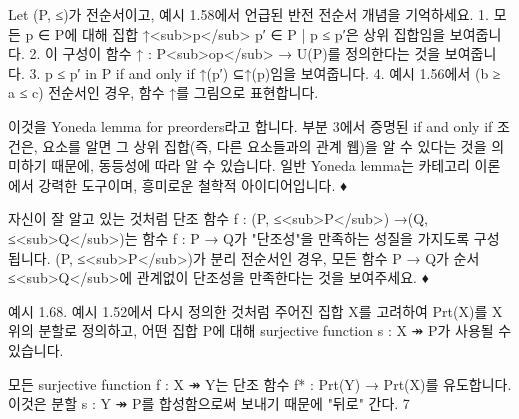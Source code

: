 \documentclass[11pt, a4paper, twoside, openany]{book}
\begin{document}
\par\medskip
\begin{exercisebox}[연습문제 1.66.]
Let (P, ≤)가 전순서이고, 예시 1.58\hspace{0pt}에서 언급된 반전 전순서 개념을 기억하세요.
1. 모든 p ∈ P\hspace{0pt}에 대해 집합 ↑<sub>p</sub> {p′ ∈ P | p ≤ p′}은 상위 집합임을 보여줍니다.
2. 이 구성이 함수 ↑ : P<sub>op</sub> → U(P)를 정의한다는 것을 보여줍니다.
3. p ≤ p′ in P if and only if ↑(p′) ⊆↑(p)임을 보여줍니다.
4. 예시 1.56\hspace{0pt}에서 (b ≥ a ≤ c) 전순서인 경우, 함수 ↑를 그림으로 표현합니다.
\end{exercisebox}

\par\medskip
이것을 Yoneda lemma for preorders\hspace{0pt}라고 합니다. 부분 3\hspace{0pt}에서 증명된 if and only if 조건은, 요소를 알면 그 상위 집합(즉, 다른 요소들과의 관계 웹)을 알 수 있다는 것을 의미하기 때문에, 동등성에 따라 알 수 있습니다. 일반 Yoneda lemma\hspace{0pt}는 카테고리 이론에서 강력한 도구이며, 흥미로운 철학적 아이디어입니다.
♦

\par\medskip
\begin{exercisebox}[연습문제 1.67.]
자신이 잘 알고 있는 것처럼 단조 함수 f : (P, ≤<sub>P</sub>) →(Q, ≤<sub>Q</sub>)는 함수 f : P → Q\hspace{0pt}가 "단조성"을 만족하는 성질을 가지도록 구성됩니다. (P, ≤<sub>P</sub>)가 분리 전순서인 경우, 모든 함수 P → Q\hspace{0pt}가 순서 ≤<sub>Q</sub>에 관계없이 단조성을 만족한다는 것을 보여주세요.
♦
\end{exercisebox}

\par\medskip
예시 1.68. 예시 1.52\hspace{0pt}에서 다시 정의한 것처럼 주어진 집합 X\hspace{0pt}를 고려하여 Prt(X)를 X 위의 분할로 정의하고, 어떤 집합 P\hspace{0pt}에 대해 surjective function s : X ↠ P\hspace{0pt}가 사용될 수 있습니다.

\par\medskip
모든 surjective function f : X ↠ Y\hspace{0pt}는 단조 함수 f* : Prt(Y) → Prt(X)를 유도합니다. 이것은 분할 s : Y ↠ P\hspace{0pt}를 합성함으로써 보내기 때문에 "뒤로" 간다. 7
\end{document}
